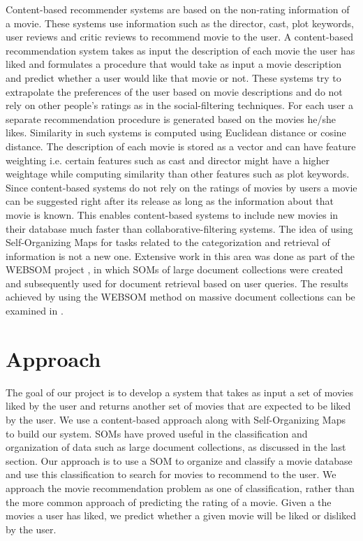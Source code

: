 \documentclass[conference]{IEEEtran}
\begin{document}
Content-based recommender systems are based on the non-rating information of a movie. These systems use information such as the director, cast, plot keywords, user reviews and critic reviews to recommend movie to the user. A content-based recommendation system takes as input the description of each movie the user has liked and formulates a procedure that would take as input a movie description and predict whether a user would like that movie or not. These systems try to extrapolate the preferences of the user based on movie descriptions and do not rely on other people’s ratings as in the social-filtering techniques. For each user a separate recommendation procedure is generated based on the movies he/she likes. Similarity in such systems is computed using Euclidean distance or cosine distance. The description of each movie is stored as a vector and can have feature weighting i.e. certain features such as cast and director might have a higher weightage while computing similarity than other features such as plot keywords. Since content-based systems do not rely on the ratings of movies by users a movie can be suggested right after its release as long as the information about that movie is known. This enables content-based systems to include new movies in their database much faster than collaborative-filtering systems.
The idea of using Self-Organizing Maps for tasks related to the categorization and retrieval of information is not a new one. Extensive work in this area was done as part of the WEBSOM project \cite{kaski1998websom}, in which SOMs of large document collections were created and subsequently used for document retrieval based on user queries. The results achieved by using the WEBSOM method on massive document collections can be examined in \cite{lagus2004mining}.


\section{Approach}
The goal of our project is to develop a system that takes as input a set of movies liked by the user and returns another set of movies that are expected to be liked by the user. We use a content-based approach along with Self-Organizing Maps to build our system. SOMs have proved useful in the classification and organization of data such as large document collections, as discussed in the last section. Our approach is to use a SOM to organize and classify a movie database and use this classification to search for movies to recommend to the user. We approach the movie recommendation problem as one of classification, rather than the more common approach of predicting the rating of a movie. Given a the movies a user has liked, we predict whether a given movie will be liked or disliked by the user. 
\end{document}

